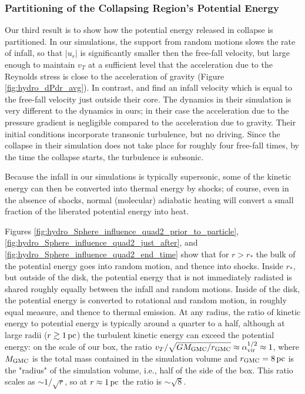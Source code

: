 \documentclass[../dissertation.tex]{subfiles}
\begin{document}
\subsubsection{Partitioning of the Collapsing Region's Potential Energy}
Our third result is to show how the potential energy released in collapse is partitioned.
In our simulations,
the support from random motions slows the rate of infall, so that $|u_r|$ is significantly smaller
then the free-fall velocity, but large enough to maintain $v_T$ at a sufficient level
that the acceleration due to the Reynolds stress is close to the acceleration of
gravity (Figure \ref{fig:hydro_dPdr_avg}).
In contrast, \citet{2010ApJ...721L.134S} and \citet{2011ApJ...731...62F} find an infall velocity which is equal to the free-fall velocity just outside their core. The dynamics in their simulation is very different to the dynamics in ours; in their case the acceleration due to the pressure gradient is negligible compared to the acceleration due to gravity. Their initial conditions incorporate transonic turbulence, but no driving. Since the collapse in their simulation does not take place for roughly four free-fall times, by the time the collapse starts, the turbulence is subsonic.

Because the infall in our simulations is typically supersonic, some of the kinetic energy can then 
be converted into thermal energy by shocks; of course, even in the absence 
of shocks, normal (molecular) adiabatic heating will convert a small fraction 
of the liberated potential energy into heat.

Figures \ref{fig:hydro_Sphere_influence_quad2_prior_to_particle},
\ref{fig:hydro_Sphere_influence_quad2_just_after}, and \ref{fig:hydro_Sphere_influence_quad2_end_time} 
show that for $r > r_*$ the bulk of the potential energy goes into random motion, 
and thence into shocks. Inside $r_*$, but outside of the disk, the potential energy 
that is not immediately radiated is shared roughly equally between the infall and 
random motions. Inside of the disk, the potential energy is converted to 
rotational and random motion, in roughly equal measure, and thence to thermal 
emission. At any radius, the ratio of kinetic energy to potential energy is
typically around a quarter to a half, although at large radii
($r\gtrsim 1\,\rm pc$) the turbulent kinetic energy can exceed the potential
energy: on the scale of our box, the ratio 
$v_T/\sqrt{GM_{\rm GMC}/r_{\rm GMC}}\approx \alpha^{1/2}_{\rm vir}\approx 1$,  
where $M_{\rm GMC}$ is the total mass contained in the simulation volume and 
$r_{\rm GMC} = 8\,\rm pc$ is the "radius" of the simulation volume, i.e., half of the side 
of the box.  This ratio scales as $\sim 1/\sqrt{r}$, so at 
$r\approx 1\,\rm pc$ the ratio is $\sim\sqrt{8}$.
\end{document}
